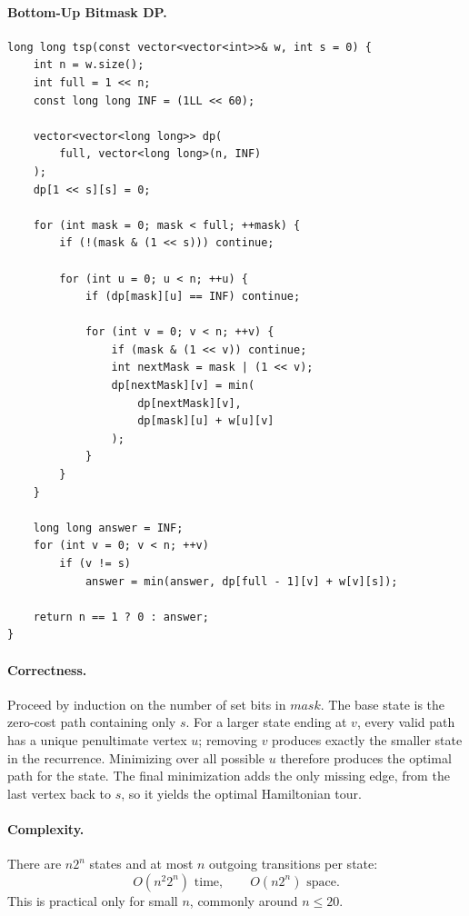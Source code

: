\documentclass[9pt]{extarticle}
\begin{document}
\paragraph{Bottom-Up Bitmask DP.}
\begin{verbatim}
long long tsp(const vector<vector<int>>& w, int s = 0) {
    int n = w.size();
    int full = 1 << n;
    const long long INF = (1LL << 60);

    vector<vector<long long>> dp(
        full, vector<long long>(n, INF)
    );
    dp[1 << s][s] = 0;

    for (int mask = 0; mask < full; ++mask) {
        if (!(mask & (1 << s))) continue;

        for (int u = 0; u < n; ++u) {
            if (dp[mask][u] == INF) continue;

            for (int v = 0; v < n; ++v) {
                if (mask & (1 << v)) continue;
                int nextMask = mask | (1 << v);
                dp[nextMask][v] = min(
                    dp[nextMask][v],
                    dp[mask][u] + w[u][v]
                );
            }
        }
    }

    long long answer = INF;
    for (int v = 0; v < n; ++v)
        if (v != s)
            answer = min(answer, dp[full - 1][v] + w[v][s]);

    return n == 1 ? 0 : answer;
}
\end{verbatim}

\paragraph{Correctness.}
Proceed by induction on the number of set bits in \(\textit{mask}\). The base
state is the zero-cost path containing only \(s\). For a larger state ending
at \(v\), every valid path has a unique penultimate vertex \(u\); removing
\(v\) produces exactly the smaller state in the recurrence. Minimizing over
all possible \(u\) therefore produces the optimal path for the state. The
final minimization adds the only missing edge, from the last vertex back to
\(s\), so it yields the optimal Hamiltonian tour.

\paragraph{Complexity.}
There are \(n2^n\) states and at most \(n\) outgoing transitions per state:
\[
O(n^2 2^n)\text{ time}, \qquad O(n2^n)\text{ space}.
\]
This is practical only for small \(n\), commonly around \(n\le 20\).
\end{document}
